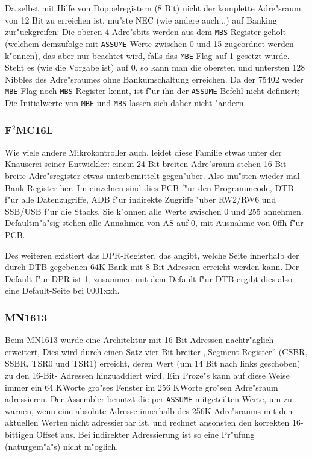 \documentclass[12pt,a4paper,twoside]{report}
\newcommand{\tty}[1]{{\tt #1}}
\begin{document}
Da selbst mit Hilfe von Doppelregistern (8 Bit) nicht der komplette
Adre"sraum von 12 Bit zu erreichen ist, mu"ste NEC (wie andere auch...)
auf Banking zur"uckgreifen: Die oberen 4 Adre"sbits werden aus dem
\tty{MBS}-Register geholt (welchem demzufolge mit \tty{ASSUME} Werte
zwischen 0 und 15 zugeordnet werden k"onnen), das aber nur beachtet
wird, falls das \tty{MBE}-Flag auf 1 gesetzt wurde.  Steht es (wie
die Vorgabe ist) auf 0, so kann man die obersten und untersten 128
Nibbles des Adre"sraumes ohne Bankumschaltung erreichen.  Da der 75402
weder \tty{MBE}-Flag noch \tty{MBS}-Register kennt, ist f"ur ihn der
\tty{ASSUME}-Befehl nicht definiert; Die Initialwerte von \tty{MBE} und
\tty{MBS} lassen sich daher nicht "andern.


\subsubsection{F$^2$MC16L}

Wie viele andere Mikrokontroller auch, leidet diese Familie etwas unter
der Knauserei seiner Entwickler: einem 24 Bit breiten Adre"sraum stehen 16
Bit breite Adre"sregister etwas unterbemittelt gegen"uber.  Also mu"sten
wieder mal Bank-Register her.  Im einzelnen sind dies PCB f"ur den
Programmcode, DTB f"ur alle Datenzugriffe, ADB f"ur indirekte Zugriffe
"uber RW2/RW6 und SSB/USB f"ur die Stacks.  Sie k"onnen alle Werte
zwischen 0 und 255 annehmen.  Defaultm"a"sig stehen alle Annahmen von AS
auf 0, mit Ausnahme von 0ffh f"ur PCB.

Des weiteren existiert das DPR-Register, das angibt, welche Seite
innerhalb der durch DTB gegebenen 64K-Bank mit 8-Bit-Adressen erreicht
werden kann.  Der Default f"ur DPR ist 1, zusammen mit dem Default f"ur
DTB ergibt dies also eine Default-Seite bei 0001xxh.


\subsubsection{MN1613}

Beim MN1613 wurde eine Architektur mit 16-Bit-Adressen nachtr"aglich erweitert,
Dies wird durch einen Satz vier Bit breiter ,,Segment-Register'' (CSBR, SSBR, TSR0
und TSR1) erreicht, deren Wert (um 14 Bit nach links geschoben) zu den 16-Bit-
Adressen hinzuaddiert wird.  Ein Proze"s kann auf diese Weise immer ein 64 KWorte
gro"ses Fenster im 256 KWorte gro"sen Adre"sraum adressieren.  Der Assembler
benutzt die per \tty{ASSUME} mitgeteilten Werte, um zu warnen, wenn eine absolute
Adresse innerhalb des 256K-Adre"sraums mit den aktuellen Werten nicht adressierbar
ist, und rechnet ansonsten den korrekten 16-bittigen Offset aus.  Bei indirekter
Adressierung ist so eine Pr"ufung (naturgem"a"s) nicht m"oglich.
\end{document}
